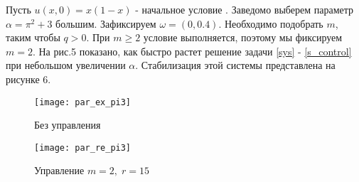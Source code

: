 \begin{exmp}
\end{exmp}

Пусть $u(x, 0) = x(1 - x)$ - начальное условие . Заведомо выберем параметр $\alpha = \pi^2 + 3$ большим. Зафиксируем $\omega = (0, 0.4)$. Необходимо подобрать $m$, таким чтобы $q > 0$. При $m \ge 2$ условие выполняется, поэтому мы фиксируем $m = 2$. На рис.5 показано, как быстро растет решение задачи \eqref{sys} - \eqref{s_control} при небольшом увеличении $\alpha$. Стабилизация этой системы представлена на рисунке 6.  

\begin{figure}[H]
\centering
\begin{minipage}{.5\textwidth}
  \centering
  \texttt{[image: par\_ex\_pi3]}
  \caption{Без управления}
  \label{fig:test1}
\end{minipage}%
\begin{minipage}{.5\textwidth}
  \centering
  \texttt{[image: par\_re\_pi3]}
  \caption{Управление $m = 2,\; r = 15$}
  \label{fig:test2}
\end{minipage}
\end{figure}
